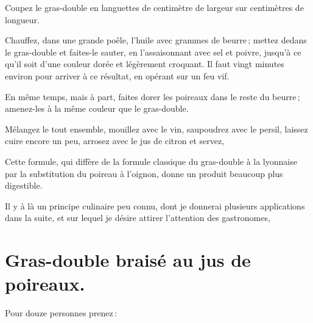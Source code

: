 Coupez le gras-double en languettes de {\mmm} centimètre de largeur sur
{\mmm} centimètres de longueur.

Chauffez, dans une grande poêle, l'huile avec {\mmm} grammes de beurre ;
mettez dedans le gras-double et faites-le sauter, en l'assaisonnant avec sel et
poivre, jusqu'à ce qu'il soit d'une couleur dorée et légèrement croquant. Il
faut vingt minutes environ pour arriver à ce résultat, en opérant sur un feu
vif.

En même temps, mais à part, faites dorer les poireaux dans le reste du beurre ;
amenez-les à la même couleur que le gras-double.

Mélangez le tout ensemble, mouillez avec le vin, saupoudrez avec le persil,
laissez cuire encore un peu, arrosez avec le jus de citron et servez,

Cette formule, qui diffère de la formule classique du gras-double à la
lyonnaise par la substitution du poireau à l'oignon, donne un produit beaucoup
plus digestible.

Il y à là un principe culinaire peu connu, dont je donnerai plusieurs
applications dans la suite, et sur lequel je désire attirer l'attention des
gastronomes,

\section*{\centering Gras-double braisé au jus de poireaux.}

Pour douze personnes prenez :

